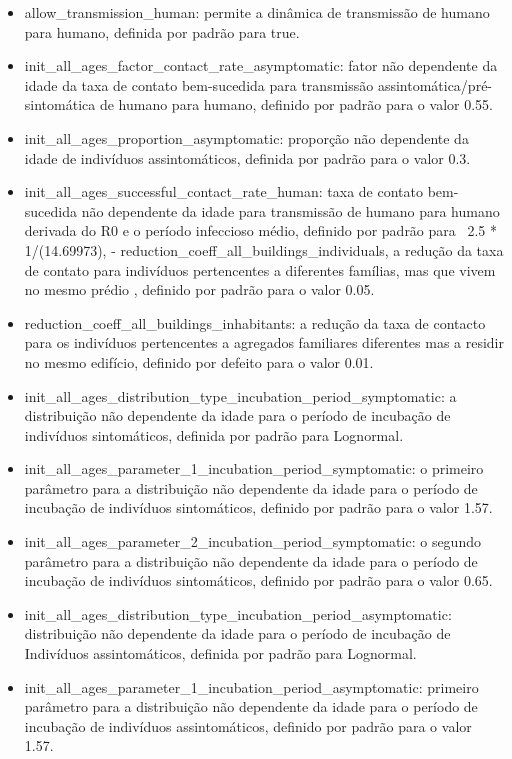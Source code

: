 \begin{itemize}
\item {allow\_transmission\_human}: permite a dinâmica de transmissão de humano para humano, definida por padrão para true.
\item {init\_all\_ages\_factor\_contact\_rate\_asymptomatic}: fator não dependente da idade da taxa de contato bem-sucedida para transmissão assintomática/pré-sintomática de humano para humano, definido por padrão para o valor 0.55.
\item {init\_all\_ages\_proportion\_asymptomatic}: proporção não dependente da idade de indivíduos assintomáticos, definida por padrão para o valor 0.3.
\item {init\_all\_ages\_successful\_contact\_rate\_human}: taxa de contato bem-sucedida não dependente da idade para transmissão de humano para humano derivada do R0 e o período infeccioso médio, definido por padrão para \ 2.5 * 1/(14.69973), - {reduction\_coeff\_all\_buildings\_individuals}, a redução da taxa de contato para indivíduos pertencentes a diferentes famílias, mas que vivem no mesmo prédio , definido por padrão para o valor 0.05.
\item {reduction\_coeff\_all\_buildings\_inhabitants}: a redução da taxa de contacto para os indivíduos pertencentes a agregados familiares diferentes mas a residir no mesmo edifício, definido por defeito para o valor 0.01.
\item {init\_all\_ages\_distribution\_type\_incubation\_period\_symptomatic}: a distribuição não dependente da idade para o período de incubação de indivíduos sintomáticos, definida por padrão para Lognormal.
\item {init\_all\_ages\_parameter\_1\_incubation\_period\_symptomatic}: o primeiro parâmetro para a distribuição não dependente da idade para o período de incubação de indivíduos sintomáticos, definido por padrão para o valor 1.57.
\item {init\_all\_ages\_parameter\_2\_incubation\_period\_symptomatic}:  o segundo parâmetro para a distribuição não dependente da idade para o período de incubação de indivíduos sintomáticos, definido por padrão para o valor 0.65.
\item {init\_all\_ages\_distribution\_type\_incubation\_period\_asymptomatic}:  distribuição não dependente da idade para o período de incubação de Indivíduos assintomáticos, definida por padrão para Lognormal.
\item {init\_all\_ages\_parameter\_1\_incubation\_period\_asymptomatic}:  primeiro parâmetro para a distribuição não dependente da idade para o período de incubação de indivíduos assintomáticos, definido por padrão para o valor 1.57.

\end{itemize}
